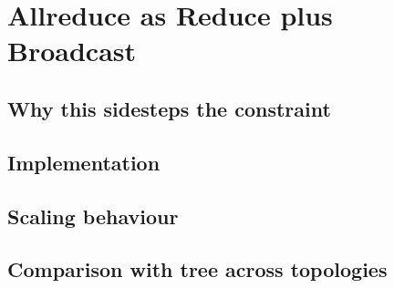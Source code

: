 \chapter{Allreduce as Reduce plus Broadcast}\label{ch:reducebcast}

\section{Why this sidesteps the constraint}
\section{Implementation}
\section{Scaling behaviour}
\section{Comparison with tree across topologies}
